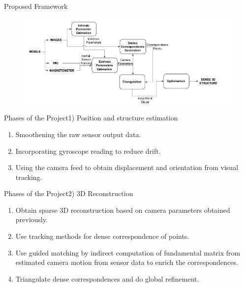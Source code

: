 \documentclass{beamer}
\begin{document}
\begin{frame}{Proposed Framework}{}
  \begin{figure}[ht!]
    \centering
    \includegraphics[width=\linewidth]{our_pipeline.png}
  \end{figure}
  \note{\textcolor{green}{Prateek\\}}

\end{frame}

\begin{frame}{Phases of the Project}{1) Position and structure estimation}
  \begin{enumerate}
        \item Smoothening the raw sensor output data.
        \item Incorporating gyroscope reading to reduce drift.
        \item Using the camera feed to obtain displacement and orientation from visual tracking.
  \end{enumerate}
  \note{\textcolor{green}{Prateek\\}}

\end{frame}
\begin{frame}{Phases of the Project}{2) 3D Reconstruction}
  \begin{enumerate}
        \item Obtain sparse 3D reconstruction based on camera parameters obtained previously.
        \item Use tracking methods for dense correspondence of points.
        \item Use guided matching by indirect computation of fundamental matrix from estimated camera motion from sensor data to enrich the correspondences.
        \item Triangulate dense correspondences and do global refinement. 
      \end{enumerate}
  \note{\textcolor{red}{Kartikeya\\}}
\end{frame}
\end{document}
